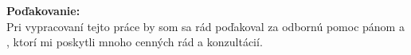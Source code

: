\begin{flushleft}
    \vspace*{\fill}
    \textbf{Poďakovanie:}\\
    \vspace{1em}
Pri vypracovaní tejto práce by som sa rád poďakoval za odbornú pomoc pánom \supervisor a \consultant, ktorí mi poskytli mnoho cenných rád a konzultácií.
\vspace{1em}\\
\end{flushleft}

